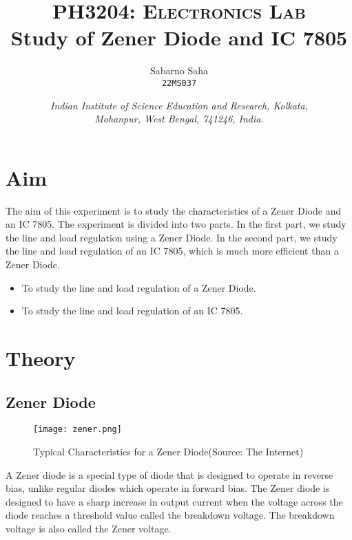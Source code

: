 \documentclass{scrartcl}
\title{
        \Large\textsc{PH3204: Electronics Lab} \\
        \vspace{10pt}
        \Huge \textbf{Study of Zener Diode and IC 7805} \\
}
\author{Sabarno Saha \\ \texttt{22MS037}}
\date{\normalsize
        \textit{Indian Institute of Science Education and Research, Kolkata, \\
        Mohanpur, West Bengal, 741246, India.}
}
\newcommand{\1}{\mathbbm{1}}
\begin{document}
\maketitle
\tableofcontents
\newpage
\section{Aim}

The aim of this experiment is to study the characteristics of a Zener Diode and an IC 7805. 
The experiment is divided into two parts. In the first part, we study the line and load regulation 
using a Zener Diode. In the second part, we study the line and load regulation of an IC 7805, which 
is much more efficient than a Zener Diode.

\begin{itemize}
	\item To study the line and load regulation of a Zener Diode.
	\item To study the line and load regulation of an IC 7805.
\end{itemize}

\section{Theory}
\subsection{Zener Diode}
\begin{figure}[H]
	\centering
	\texttt{[image: zener.png]}
	\caption{Typical Characteristics for a Zener Diode(Source: The Internet)}
\end{figure}
A Zener diode is a special type of diode that is designed to operate in reverse bias, unlike 
regular diodes which operate in forward bias. The Zener diode is designed to have a sharp 
increase in output current when the voltage across the diode reaches a threshold value called 
the breakdown voltage. The breakdown voltage is also called the Zener voltage.
\end{document}
